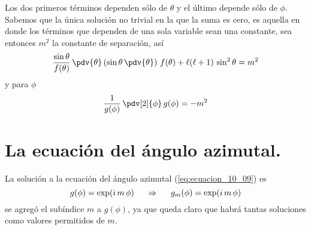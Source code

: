 Los dos primeros términos dependen sólo de $\theta$ y el último depende sólo de $\phi$. Sabemos que la única solución no trivial en la que la suma es cero, es aquella en donde los términos que dependen de una sola variable sean una constante, sea entonces $m^{2}$ la constante de separación, así
\begin{align}
\dfrac{\sin \theta}{f(\theta)} \, \pdv{\theta} \left( \sin \theta \, \pdv{\theta} \right) \, f(\theta) + \ell (\ell + 1) \, \sin^{2} \theta = m^{2}
\label{eq:ecuacion_10_08}
\end{align}
y para $\phi$
\begin{align}
\dfrac{1}{g(\phi)} \, \pdv[2]{\phi} \, g(\phi) = -m^{2}
\label{eq:ecuacion_10_09}
\end{align}
\section{La ecuación del ángulo azimutal.}
La solución a la ecuación del ángulo azimutal (\ref{eq:ecuacion_10_09}) es
\begin{equation}
g(\phi) = \exp(i \, m \, \phi) \hspace{0.5cm} \Rightarrow \hspace{0.5cm} g_{m} (\phi) = \exp(i \, m \, \phi)
\label{eq:ecuacion_10_10}
\end{equation}
se agregó el subíndice $m$ a $g(\phi)$, ya que queda claro que habrá tantas soluciones como valores permitidos de $m$.
